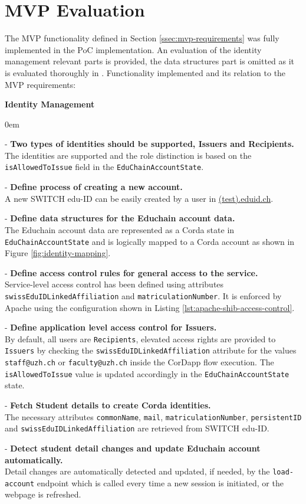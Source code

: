 \section{MVP Evaluation}

The MVP functionality defined in Section \ref{ssec:mvp-requirements} was fully implemented in the PoC implementation. An evaluation of the identity management relevant parts is provided, the data structures part is omitted as it is evaluated thoroughly in \cite{mueller20}. Functionality implemented and its relation to the MVP requirements:

\textbf{Identity Management}
\begin{description}[leftmargin=15pt]
	\itemsep0em
	\item - \textbf{Two types of identities should be supported, Issuers and Recipients.} \\
	The identities are supported and the role distinction is based on the \texttt{isAllowedToIssue} field in the \texttt{EduChainAccountState}. 
    \item - \textbf{Define process of creating a new account.} \hfill \\
    A new SWITCH edu-ID can be easily created by a user in \url{(test).eduid.ch}.
	\item - \textbf{Define data structures for the Educhain account data.} \hfill \\
	The Educhain account data are represented as a Corda state in \texttt{EduChainAccountState} and is logically mapped to a Corda account as shown in Figure \ref{fig:identity-mapping}. 
	\item - \textbf{Define access control rules for general access to the service.} \hfill \\
	Service-level access control has been defined using attributes \texttt{swissEduIDLinkedAffiliation} and \texttt{matriculationNumber}. It is enforced by Apache using the configuration shown in Listing \ref{lst:apache-shib-access-control}.
	\item - \textbf{Define application level access control for Issuers.} \hfill \\
	By default, all users are \texttt{Recipients}, elevated access rights are provided to \texttt{Issuers} by checking the \texttt{swissEduIDLinkedAffiliation} attribute for the values \texttt{staff@uzh.ch} or \texttt{faculty@uzh.ch} inside the CorDapp flow execution. The \texttt{isAllowedToIssue} value is updated accordingly in the \texttt{EduChainAccountState} state.
	\item - \textbf{Fetch Student details to create Corda identities.} \hfill \\
	The necessary attributes \texttt{commonName}, \texttt{mail}, \texttt{matriculationNumber}, \texttt{persistentID} and \texttt{swissEduIDLinkedAffiliation} are retrieved from SWITCH edu-ID.
	\item - \textbf{Detect student detail changes and update Educhain account automatically.} \hfill \\
	Detail changes are automatically detected and updated, if needed, by the \texttt{load-account} endpoint which is called every time a new session is initiated, or the webpage is refreshed.
\end{description}
